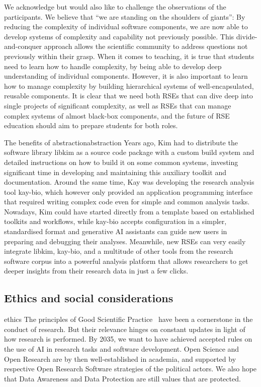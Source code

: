 \documentclass{eceasst}
\begin{document}
We acknowledge but would also like to challenge the observations of the participants.
We believe that ``we are standing on the shoulders of giants'':
By reducing the complexity of individual software components,
we are now able to develop systems of complexity and capability not previously possible.
This divide-and-conquer approach allows the scientific community to address questions not previously within their grasp.
When it comes to teaching, it is true that students need to learn how to handle complexity,
by being able to develop deep understanding of individual components.
However, it is also important to learn how to manage complexity
by building hierarchical systems of well-encapsulated, reusable components.
It is clear that we need both RSEs that can dive deep into single projects of significant complexity,
as well as RSEs that can manage complex systems of almost black-box components,
and the future of RSE education should aim to prepare students for both roles.

\begin{story}{The benefits of abstraction}{abstraction}
Years ago, Kim had to distribute the software library libkim as a source code package
with a custom build system and detailed instructions on how to build it on some common systems,
investing significant time in developing and maintaining this auxiliary toolkit and documentation.
Around the same time, Kay was developing the research analysis tool kay-bio,
which however only provided an application programming interface that
required writing complex code even for simple and common analysis tasks.
Nowadays, Kim could have started directly from a template based on established toolkits and workflows,
while kay-bio accepts configuration in a simpler, standardised format and generative AI assistants
can guide new users in preparing and debugging their analyses.
Meanwhile, new RSEs can very easily integrate libkim, kay-bio, and a multitude
of other tools from the research software corpus into a powerful analysis
platform that allows researchers to get deeper insights from their research data
in just a few clicks.
\end{story}

\subsection{Ethics and social considerations}
\begin{whatis}{}{ethics}
The principles of Good Scientific Practice~\cite{dfg_gsp} have been a cornerstone in the conduct of research.
But their relevance hinges on constant updates in light of how research is performed.
By 2035, we want to have achieved accepted rules on the use of AI in research tasks and software development.
Open Science and Open Research are by then well-established in academia, and supported by respective Open Research Software
strategies of the political actors. We also hope that Data Awareness and Data Protection are still values
that are protected.
\end{whatis}
\end{document}
